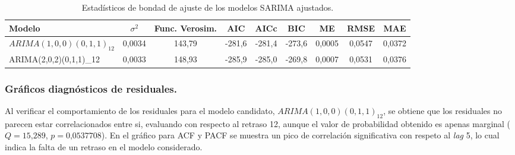 \documentclass[]{article}
\begin{document}
\begin{table}

\caption{\label{tab:fitting-sarima}Estadísticos de bondad de ajuste de los modelos SARIMA ajustados.}
\centering
\begin{tabular}[t]{l|c|c|c|c|c|c|c|c}
\hline
Modelo & $\sigma^2$ & Func. Verosim. & AIC & AICc & BIC & ME & RMSE & MAE\\
\hline
$ARIMA(1,0,0)(0,1,1)_12$ & 0,0034 & 143,79 & -281,6 & -281,4 & -273,6 & 0,0005 & 0,0547 & 0,0372\\
\hline
ARIMA(2,0,2)(0,1,1)_12 & 0,0033 & 148,93 & -285,9 & -285,0 & -269,8 & 0,0007 & 0,0531 & 0,0376\\
\hline
\end{tabular}
\end{table}

\hypertarget{gruxe1ficos-diagnuxf3sticos-de-residuales.}{%
\subsubsection{Gráficos diagnósticos de residuales.}\label{gruxe1ficos-diagnuxf3sticos-de-residuales.}}

Al verificar el comportamiento de los residuales para el modelo candidato, \(ARIMA(1,0,0)(0,1,1)_{12}\), se obtiene que los residuales no parecen estar correlacionados entre si, evaluando con respecto al retraso 12, aunque el valor de probabilidad obtenido es apenas marginal (\(Q=\text{15,289}\), \(p=\text{0,0537708}\)).
En el gráfico para ACF y PACF se muestra un pico de correlación significativa con respeto al \emph{lag} 5, lo cual indica la falta de un retraso en el modelo considerado.
\end{document}
